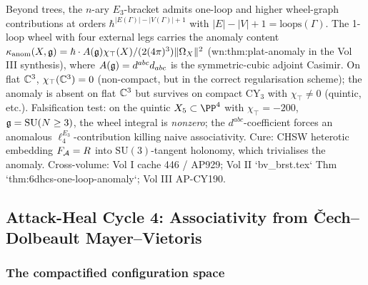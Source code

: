 \begin{proposition}\ClaimStatusProposition
\label{opus12:prop:wheel-anomaly}
Beyond trees, the $n$-ary $E_3$-bracket admits one-loop and higher
wheel-graph contributions at orders $\hbar^{|E(\Gamma)| - |V(\Gamma)|
+ 1}$ with $|E| - |V| + 1 = \mathrm{loops}(\Gamma)$. The 1-loop wheel
with four external legs carries the anomaly content
$\kappa_{\mathrm{anom}}(X, \mathfrak{g}) = \hbar \cdot A(\mathfrak{g}) \chi_{\top}(X)
/(2(4\pi)^3) \|\Omega_X\|^2$ (wn:thm:plat-anomaly in the Vol III
synthesis), where $A(\mathfrak{g}) = d^{abc} d_{abc}$ is the symmetric-cubic
adjoint Casimir. On flat $\mathbb{C}^3$, $\chi_\top(\mathbb{C}^3) = 0$
(non-compact, but in the correct regularisation scheme); the anomaly
is absent on flat $\mathbb{C}^3$ but survives on compact CY$_3$ with
$\chi_\top \ne 0$ (quintic, etc.). Falsification test: on the
quintic $X_5 \subset \PP^4$ with $\chi_\top = -200$, $\mathfrak{g} = \mathrm{SU}(N
\ge 3)$, the wheel integral is \emph{nonzero}; the
$d^{abc}$-coefficient forces an anomalous $\ell_4^{E_3}$-contribution
killing naive associativity. Cure: CHSW heterotic embedding
$F_{\mathcal{A}} = R$ into $\mathrm{SU}(3)$-tangent holonomy, which
trivialises the anomaly. Cross-volume: Vol I cache 446 / AP929; Vol
II `bv_brst.tex` Thm `thm:6dhcs-one-loop-anomaly`; Vol III AP-CY190.
\end{proposition}

\subsection{Attack-Heal Cycle 4: Associativity from Čech--Dolbeault Mayer--Vietoris}
\label{opus12:sec:cycle4-assoc}

\begin{center}
\end{center}

\subsubsection{The compactified configuration space}

